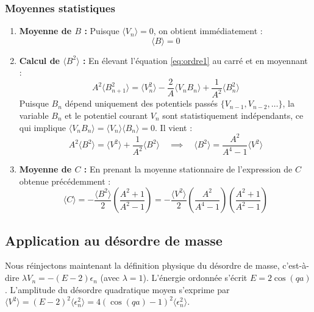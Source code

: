 \subsubsection{Moyennes statistiques}
\begin{enumerate}
    \item \textbf{Moyenne de $B$ :}
    Puisque $\langle V_n \rangle = 0$, on obtient immédiatement :
    \begin{equation*}
        \langle B \rangle = 0
    \end{equation*}
    
    \item \textbf{Calcul de $\langle B^2 \rangle$ :}
    En élevant l'équation \eqref{eq:ordre1} au carré et en moyennant :
    \begin{equation*}
        A^2 \langle B_{n+1}^2 \rangle = \langle V_n^2 \rangle - \frac{2}{A}\langle V_n B_n \rangle + \frac{1}{A^2}\langle B_n^2 \rangle
    \end{equation*}
    Puisque $B_n$ dépend uniquement des potentiels passés $\{V_{n-1}, V_{n-2}, \dots\}$, la variable $B_n$ et le potentiel courant $V_n$ sont statistiquement indépendants, ce qui implique $\langle V_n B_n \rangle = \langle V_n \rangle\langle B_n \rangle = 0$. Il vient :
    \begin{equation*}
        A^2 \langle B^2 \rangle = \langle V^2 \rangle + \frac{1}{A^2}\langle B^2 \rangle \quad \implies \quad \langle B^2 \rangle = \frac{A^2}{A^4 - 1}\langle V^2 \rangle
    \end{equation*}
    
    \item \textbf{Moyenne de $C$ :}
    En prenant la moyenne stationnaire de l'expression de $C$ obtenue précédemment :
    \begin{equation*}
        \langle C \rangle = -\frac{\langle B^2 \rangle}{2} \left( \frac{A^2 + 1}{A^2 - 1} \right) = -\frac{\langle V^2 \rangle}{2} \left( \frac{A^2}{A^4 - 1} \right) \left( \frac{A^2 + 1}{A^2 - 1} \right)
    \end{equation*}
\end{enumerate}

\subsection{Application au désordre de masse}

Nous réinjectons maintenant la définition physique du désordre de masse, c'est-à-dire $\lambda V_n = -(E - 2)\epsilon_n$ (avec $\lambda=1$).
L'énergie ordonnée s'écrit $E = 2\cos(qa)$. L'amplitude du désordre quadratique moyen s'exprime par $\langle V^2 \rangle = (E - 2)^2 \langle \epsilon_n^2 \rangle = 4(\cos(qa) - 1)^2 \langle \epsilon_n^2 \rangle$.

